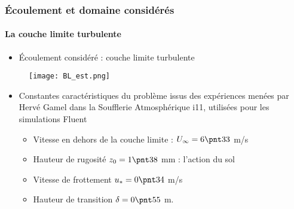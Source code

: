 \documentclass[12pt, xcolor=svgnames]{beamer}
\newcommand{\bwarrow}{\item[\color{DarkRed} \ding{227}]}
\newcommand{\warrow}{\item[\color{blue!50!black!70} \tiny{\ding{109}}]}
\begin{document}


\begin{frame}
\frametitle{Écoulement et domaine considérés }
\framesubtitle{La couche limite turbulente}
\begin{itemize}
	\bwarrow Écoulement considéré : couche limite turbulente 
\end{itemize}
\vspace{-0.6cm}
\begin{figure}[!ht]
\centering
\texttt{[image: BL\_est.png]}
\end{figure}
\begin{itemize}
	\bwarrow{Constantes caractéristiques du problème issus des expériences menées par Hervé Gamel dans la Soufflerie Atmosphérique i11, utilisées pour les simulations Fluent }	
	\begin{itemize}
		\warrow Vitesse en dehors de la couche limite : $U_\infty = 6\pnt 33$ m/s 
		\warrow Hauteur de rugosité  $z_0 = 1\pnt38$ mm : l'action du sol
		\warrow	Vitesse de frottement $u_* = 0\pnt34$ m/s
		\warrow Hauteur de transition  $\delta = 0\pnt 55$  m.
	\end{itemize}
\end{itemize}
\end{frame}
    
\end{document}
